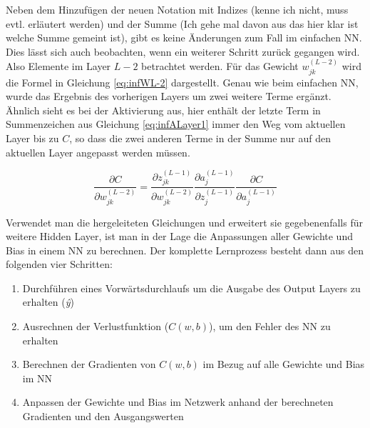 Neben dem Hinzufügen der neuen Notation mit Indizes (kenne ich nicht, muss evtl. erläutert werden) und der Summe (Ich gehe mal davon aus das hier klar ist welche Summe gemeint ist), gibt es keine Änderungen zum Fall im einfachen \ac{NN}. Dies lässt sich auch beobachten, wenn ein weiterer Schritt zurück gegangen wird. Also Elemente im Layer $L-2$ betrachtet werden. Für das Gewicht $w_{j k}^{(L-2)}$ wird die Formel in Gleichung \ref{eq:infWL-2} dargestellt. Genau wie beim einfachen \ac{NN}, wurde das Ergebnis des vorherigen Layers um zwei weitere Terme ergänzt. Ähnlich sieht es bei der Aktivierung aus, hier enthält der letzte Term in Summenzeichen aus Gleichung \ref{eq:infALayer1} immer den Weg vom aktuellen Layer bis zu $C$, so dass die zwei anderen Terme in der Summe nur auf den aktuellen Layer angepasst werden müssen. 

\begin{equation} \label{eq:infWL-2}
    \frac{\partial C}{\partial w_{j k}^{(L-2)}}=\frac{\partial z_{j k}^{(L-1)}}{\partial w_{j k}^{(L-2)}} \frac{\partial a_{j}^{(L-1)}}{\partial z_{j}^{(L-1)}} \frac{\partial C}{\partial a_{j}^{(L-1)}}
\end{equation}

Verwendet man die hergeleiteten Gleichungen und erweitert sie gegebenenfalls für weitere Hidden Layer, ist man in der Lage die Anpassungen aller Gewichte und Bias in einem \ac{NN} zu berechnen. Der komplette Lernprozess besteht dann aus den folgenden vier Schritten:

\begin{enumerate}
    \item Durchführen eines Vorwärtsdurchlaufs um die Ausgabe des Output Layers zu erhalten (\textit{\^{y}})
    \item Ausrechnen der Verlustfunktion ($C(w,b)$), um den Fehler des \ac{NN} zu erhalten
    \item Berechnen der Gradienten von $C(w,b)$ im Bezug auf alle Gewichte und Bias im \ac{NN}
    \item Anpassen der Gewichte und Bias im Netzwerk anhand der berechneten Gradienten und den Ausgangswerten
\end{enumerate}